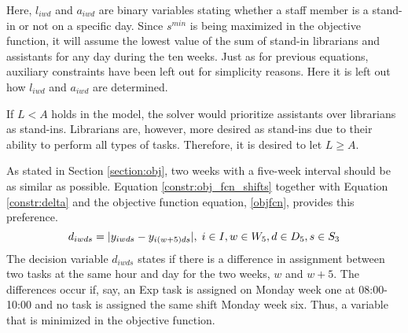 Here, $l_{iwd}$ and $a_{iwd}$ are binary variables stating whether a staff member is a stand-in or not on a specific day. Since $s^{min}$ is being maximized in the objective function, it will assume the lowest value of the sum of stand-in librarians and assistants for any day during the ten weeks. Just as for previous equations, auxiliary constraints have been left out for simplicity reasons. Here it is left out how $l_{iwd}$ and $a_{iwd}$ are determined.

If $L < A$ holds in the model, the solver would prioritize assistants over librarians as stand-ins. Librarians are, however, more desired as stand-ins due to their ability to perform all types of tasks. Therefore, it is desired to let $L \geq A$.

As stated in Section \ref{section:obj}, two weeks with a five-week interval should be as similar as possible. Equation \ref{constr:obj_fcn_shifts} together with Equation \ref{constr:delta} and the objective function equation, \ref{objfcn}, provides this preference.
\begin{equation} \label{constr:obj_fcn_shifts}
d_{iwds} = \lvert y_{iwds} - y_{i(w+5)ds}\rvert, \;   i \in I, w \in W_5, d \in D_5, s \in S_3
\end{equation}
The decision variable $d_{iwds}$ states if there is a difference in assignment between two tasks at the same hour and day for the two weeks, $w$ and $w+5$. The differences occur if, say, an Exp task is assigned on Monday week one at 08:00-10:00 and no task is assigned the same shift Monday week six. Thus, a variable that is minimized in the objective function.

